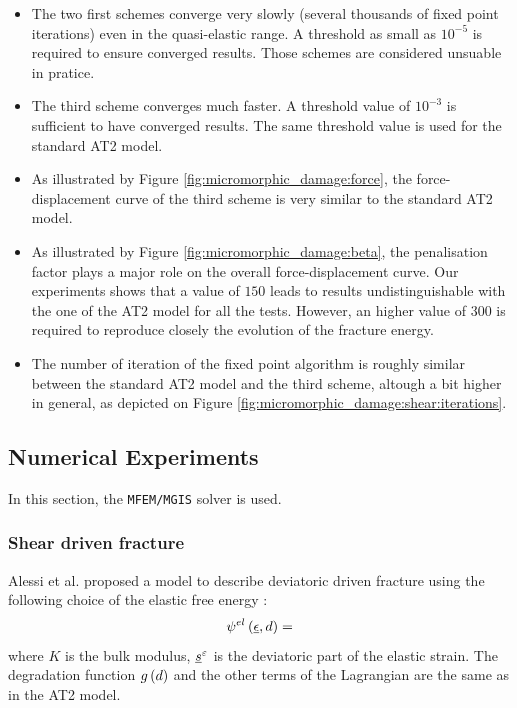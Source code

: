 \begin{itemize}
  \item The two first schemes converge very slowly (several thousands of fixed
  point iterations) even in the quasi-elastic range. A threshold as
  small as \(10^{-5}\) is required to ensure converged results. Those
  schemes are considered unsuable in pratice.
  \item The third scheme converges much faster. A threshold value of
  \(10^{-3}\) is sufficient to have converged results. The same
  threshold value is used for the standard AT2 model.
  \item As illustrated by Figure \ref{fig:micromorphic_damage:force}, the
  force-displacement curve of the third scheme is very similar to the
  standard AT2 model.
  \item As illustrated by Figure \ref{fig:micromorphic_damage:beta}, the
  penalisation factor plays a major role on the overall
  force-displacement curve. Our experiments shows that a value of
  \(150\) leads to results undistinguishable with the one of the AT2
  model for all the tests. However, an higher value of \(300\) is
  required to reproduce closely the evolution of the fracture energy.
  \item The number of iteration of the fixed point algorithm is roughly
  similar between the standard AT2 model and the third scheme, altough a
  bit higher in general, as depicted on Figure
  \ref{fig:micromorphic_damage:shear:iterations}.
\end{itemize}

\subsection{Numerical Experiments}
\label{sec:micromorphicdamage:numerical_experiments}

In this section, the \texttt{MFEM/MGIS} solver is used.

\subsubsection{Shear driven fracture}

Alessi et al. proposed a model to describe deviatoric driven fracture
using the following choice of the elastic free energy
\cite{alessi_phase-field_2020}:
\[
{\psi}^{el}\left(\underline{\epsilon}, d\right)=
\]
where \(K\) is the bulk modulus, \(\underline{s}^{\varepsilon}\) is the
deviatoric part of the elastic strain. The degradation function
\(g\left(d\right)\) and the other terms of the Lagrangian are the same as in
the AT2 model.

